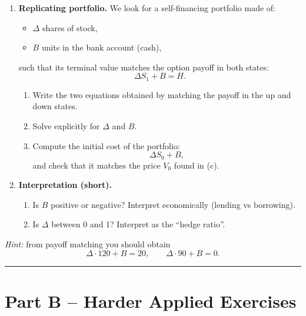 \documentclass[11pt]{article}
\begin{document}
\begin{enumerate}
\begin{enumerate}
\item \textbf{Replicating portfolio.}
We look for a self-financing portfolio made of:
\begin{itemize}
  \item \(\Delta\) shares of stock,
  \item \(B\) units in the bank account (cash),
\end{itemize}
such that its terminal value matches the option payoff in both states:
\[
\Delta S_1 + B = H.
\]
\begin{enumerate}
\item Write the two equations obtained by matching the payoff in the up and down states.
\item Solve explicitly for \(\Delta\) and \(B\).
\item Compute the initial cost of the portfolio:
\[
\Delta S_0 + B,
\]
and check that it matches the price \(V_0\) found in (c).
\end{enumerate}

\item \textbf{Interpretation (short).}
\begin{enumerate}
\item Is \(B\) positive or negative? Interpret economically (lending vs borrowing).
\item Is \(\Delta\) between 0 and 1? Interpret as the “hedge ratio”.
\end{enumerate}

\end{enumerate}

\emph{Hint:} from payoff matching you should obtain
\[
\Delta\cdot 120 + B = 20,
\qquad
\Delta\cdot 90 + B = 0.
\]
\end{enumerate}

\bigskip
\hrule
\bigskip

\section*{Part B -- Harder Applied Exercises}
\end{document}
